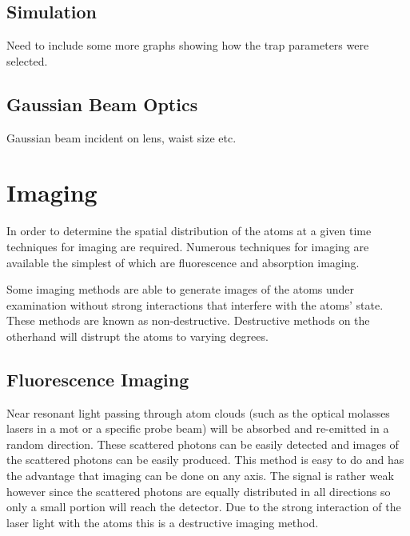 \subsection{Simulation}

{\color{red}Need to include some more graphs showing how the trap parameters were selected.}

\subsection{Gaussian Beam Optics}

Gaussian beam incident on lens, waist size etc.

\section{Imaging}

In order to determine the spatial distribution of the atoms at a given time techniques for imaging are required. Numerous techniques for imaging are available the simplest of which are fluorescence and absorption imaging.

Some imaging methods are able to generate images of the atoms under examination without strong interactions that interfere with the atoms' state. These methods are known as non-destructive. Destructive methods on the otherhand will distrupt the atoms to varying degrees.

\subsection{Fluorescence Imaging}

Near resonant light passing through atom clouds (such as the optical molasses lasers in a \gls{mot} or a specific probe beam) will be absorbed and re-emitted in a random direction. These scattered photons can be easily detected and images of the scattered photons can be easily produced. This method is easy to do and has the advantage that imaging can be done on any axis. The signal is rather weak however since the scattered photons are equally distributed in all directions so only a small portion will reach the detector. Due to the strong interaction of the laser light with the atoms this is a destructive imaging method.

